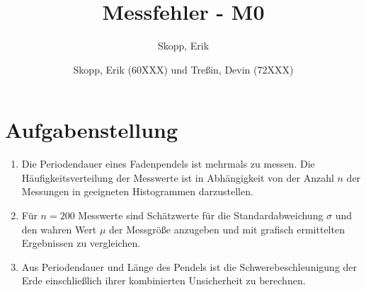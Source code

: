 \documentclass[fleqn,10pt]{olplainarticle}
\title{Messfehler - M0}
\author[1]{Skopp, Erik}
\author[2]{Skopp, Erik (60XXX) und Treßin, Devin (72XXX)}
\begin{document}
\flushbottom
\maketitle
\thispagestyle{empty}

\section{Aufgabenstellung}
\begin{enumerate}
    \item Die Periodendauer eines Fadenpendels ist mehrmals zu messen. Die Häufigkeitsverteilung der Messwerte ist in Abhängigkeit von der Anzahl $n$ der Messungen in geeigneten Histogrammen darzustellen. 

    \item Für $n = 200 $ Messwerte sind Schätzwerte für die Standardabweichung $ \sigma $  und den wahren Wert $\mu $ der Messgröße anzugeben und mit grafisch ermittelten Ergebnissen zu vergleichen. 

    \item  Aus Periodendauer und Länge des Pendels ist die Schwerebeschleunigung der Erde einschließlich ihrer kombinierten Unsicherheit zu berechnen. 
\end{enumerate}
\end{document}
